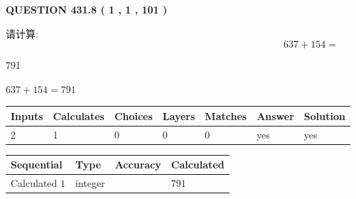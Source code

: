\documentclass{ctexart}
\begin{document}
   
  
\vspace{0.2in}
  
{\textbf{\Large{QUESTION
431.8 
 ( 1 , 1 , 101 )
}}}
  
  
 
请计算:
\begin{equation}
637 +  %
154 = \nonumber
\end{equation}
 
 
 
\noindent{}
 
 

791
 
 
\noindent{}
 
 

 
 
 
\noindent{}
 
 

$ %
637 +  %
154=   %
791$
 
 
\noindent{}
 
 

 
   
   
   
   
\noindent\begin{tabular}{|l|l|l|l|l|l|l|}
 \hline
Inputs & Calculates & Choices & Layers & Matches & Answer & Solution \\ \hline
 2  & 
 1  & 
 0
  & 
 0  & 
 0  & 
  yes & 
  yes 
  \\ \hline
 \end{tabular}
   
   
   
   
\noindent{}
   
   
  
  
\noindent\begin{tabular}{|l|l|l|l|}
\hline
 Sequential & Type & Accuracy & Calculated \\ 
\hline
 
 
  Calculated $  1 $ & integer &  & 
  $ 791 $ 
 \\  \hline  
 \end{tabular}
   
\end{document}

